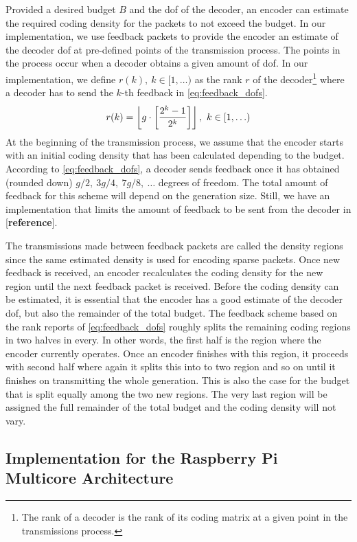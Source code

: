 Provided a desired budget $B$ and the \ac{dof} of the decoder, an encoder
can estimate the required coding density for the packets to not exceed the
budget. In our implementation, we use feedback packets to provide the
encoder an estimate of the decoder \ac{dof} at pre-defined points of the
transmission process. The points in the process occur when a decoder
obtains a given amount of \ac{dof}. In our implementation, we define $r(k),\
k \in [1, \ldots)$ as the rank $r$ of the decoder\footnote{The rank of
a decoder is the rank of its coding matrix at a given point in the
transmissions process.} where a decoder has to send the $k$-th feedback in
\eqref{eq:feedback_dofs}.
%
\begin{equation}\label{eq:feedback_dofs}
    r(k) = \left\lfloor g\cdot \left[\frac{2^k -1}{2^k}\right]\right\rfloor,\ k \in [1,\ldots)
\end{equation}
%
At the beginning of the transmission process, we assume that the encoder
starts with an initial coding density that has been calculated depending to
the budget. According to \eqref{eq:feedback_dofs}, a decoder sends feedback
once it has obtained (rounded down) $g/2,\ 3g/4,\ 7g/8,\ \ldots$  degrees of
freedom. The total amount of feedback for this scheme will depend on the
generation size. Still, we have an implementation that limits the amount of
feedback to be sent from the decoder in [\textbf{reference}].

The transmissions made between feedback packets are called the density
regions since the same estimated density is used for encoding sparse
packets. Once new feedback is received, an encoder recalculates the coding
density for the new region until the next feedback packet is received.
Before the coding density can be estimated, it is essential that the
encoder has a good estimate of the decoder \ac{dof}, but also the remainder
of the total budget. The feedback scheme based on the rank reports of
\eqref{eq:feedback_dofs} roughly splits the remaining coding regions in
two halves in every. In other words, the first half is the region where
the encoder currently operates. Once an encoder finishes with this region,
it proceeds with second half where again it splits this into to two region
and so on until it finishes on transmitting the whole generation. This is
also the case for the budget that is split equally among the two new
regions. The very last region will be assigned the full remainder of
the total budget and the coding density will not vary.

\subsection{Implementation for the Raspberry Pi Multicore Architecture}
\label{sub:implementation-multicore}

